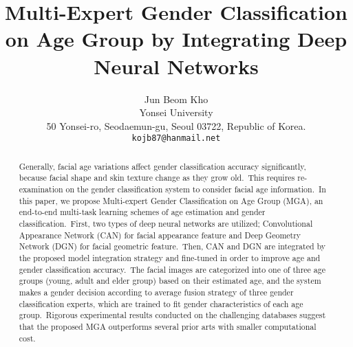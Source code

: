 \documentclass[10pt,twocolumn,letterpaper]{article}
\begin{document}
\title{Multi-Expert Gender Classification on Age Group by Integrating Deep Neural Networks}

\author{Jun Beom Kho\\
Yonsei University\\
50 Yonsei-ro, Seodaemun-gu, Seoul 03722, Republic of Korea.\\
{\tt\small kojb87@hanmail.net}
}

\maketitle

\begin{abstract}
    Generally, facial age variations affect gender classification accuracy significantly, because facial shape and skin texture change as they grow old.~This requires re-examination on the gender classification system to consider facial age information.~In this paper, we propose Multi-expert Gender Classification on Age Group (MGA), an end-to-end multi-task learning schemes of age estimation and gender classification.~First, two types of deep neural networks are utilized; Convolutional Appearance Network (CAN) for facial appearance feature and Deep Geometry Network (DGN) for facial geometric feature.~Then, CAN and DGN are integrated by the proposed model integration strategy and fine-tuned in order to improve age and gender classification accuracy.~The facial images are categorized into one of three age groups (young, adult and elder group) based on their estimated age, and the system makes a gender decision according to average fusion strategy of three gender classification experts, which are trained to fit gender characteristics of each age group.~Rigorous experimental results conducted on the challenging databases suggest that the proposed MGA outperforms several prior arts with smaller computational cost.
\end{abstract}

\end{document}

